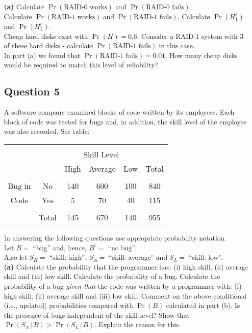 \documentclass[]{article}
\begin{document}
{\bf(a)} Calculate $\Pr(\text{RAID-0 works})$ and $\Pr(\text{RAID-0 fails})$. \\[0.3cm]  Calculate $\Pr(\text{RAID-1 works})$ and $\Pr(\text{RAID-1 fails})$.  Calculate $\Pr(H_1^c)$ and $\Pr(H_2^c)$. \\[0.3cm]
 Cheap hard disks exist with $\Pr(H) = 0.6$. Consider a RAID-1 system with 3 of these hard disks - calculate $\Pr(\text{RAID-1 fails})$ in this case. \\[0.3cm]  In part (a) we found that $\Pr(\text{RAID-1 fails}) = 0.01$. How many cheap disks would be required to match this level of reliability?



\subsection*{Question 5}
A software company examined blocks of code written by its employees. Each block of code was tested for bugs and, in addition, the skill level of the employee was also recorded. See table:
\begin{center}
	\begin{tabular}{|cc|ccc|c|}
		\hline
		&&&&&\\[-0.4cm]
		&& \multicolumn{3}{|c|}{Skill Level} &  \\
		&& High & Average & Low & Total \\
		\hline
		&&&&&\\[-0.4cm]
		Bug in   & No    &  140 &   600  & 100 & 840 \\
		Code & Yes   &    5 &    70  &  40 & 115 \\
		\hline
		&&&&&\\[-0.4cm]
		&Total &  145 &   670  & 140 & 955 \\
		\hline
	\end{tabular}
\end{center}
In answering the following questions use appropriate probability notation.\\[0.2cm]
Let $B =$ ``bug'' and, hence, $B^c =$ ``no bug''.\\[0.1cm]
Also let $S_H = $ ``skill: high'', $S_A = $ ``skill: average'' and $S_L =$ ``skill: low''.\\[-0.2cm]

{\bf(a)} Calculate the probability that the programmer has: (i) high skill, (ii) average skill and (iii) low skill.  Calculate the probability of a bug.  Calculate the probability of a bug \emph{given that} the code was written by a programmer with: (i) high skill, (ii) average skill and (iii) low skill.  Comment on the above conditional (i.e., updated) probabilities compared with $\Pr(B)$ calculated in part (b). Is the presence of bugs independent of the skill level?  Show that $\Pr(S_A\,|\,B) > \Pr(S_L\,|\,B)$. Explain the reason for this.
\end{document}
